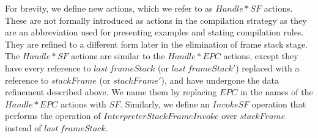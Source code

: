 For brevity, we define new actions, which we refer to as $Handle*SF$
actions.
These are not formally introduced as actions in the compilation
strategy as they are an abbreviation used for presenting examples and
stating compilation rules.
They are refined to a different form later in the elimination of frame
stack stage.
The $Handle*SF$ actions are similar to the $Handle*EPC$ actions,
except they have every reference to $last~frameStack$ (or
$last~frameStack'$) replaced with a reference to $stackFrame$ (or
$stackFrame'$), and have undergone the data refinement described
above.
We name them by replacing $EPC$ in the names of the $Handle*EPC$
actions with $SF$.
Similarly, we define an $InvokeSF$ operation that performs the
operation of $InterpreterStackFrameInvoke$ over $stackFrame$ instead
of $last~frameStack$.

